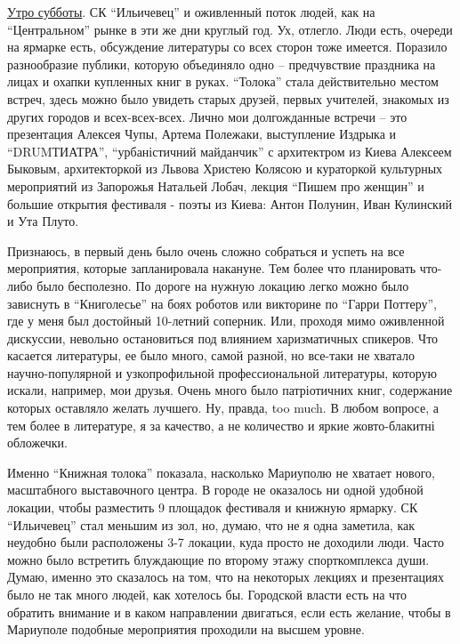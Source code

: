 \href{https://mrpl.city/news/view/knizhnaya-toloka-v-mariupole-kak-prohodit-pervyj-den-literaturnogo-festivalya-foto-plusvideo}{Утро
субботы}. СК \enquote{Ильичевец} и оживленный поток людей, как на \enquote{Центральном} рынке в
эти же дни круглый год. Ух, отлегло. Люди есть, очереди на ярмарке есть,
обсуждение литературы со всех сторон тоже имеется. Поразило разнообразие
публики, которую объединяло одно – предчувствие праздника на лицах и охапки
купленных книг в руках. \enquote{Толока} стала действительно местом встреч, здесь можно
было увидеть старых друзей, первых учителей, знакомых из других городов и
всех-всех-всех. Лично мои долгожданные встречи – это презентация Алексея Чупы,
Артема Полежаки, выступление Издрыка и \enquote{DRUMТИАТРА}, \enquote{урбаністичний майданчик}
с архитектром из Киева Алексеем Быковым, архитекторкой из Львова Христею
Колясою и кураторкой культурных мероприятий из Запорожья Натальей Лобач, лекция
\enquote{Пишем про женщин} и большие открытия фестиваля - поэты из Киева: Антон
Полунин, Иван Кулинский и Ута Плуто.


Признаюсь, в первый день было очень сложно собраться и успеть на все
мероприятия, которые запланировала накануне. Тем более что планировать что-либо
было бесполезно. По дороге на нужную локацию легко можно было зависнуть в
\enquote{Книголесье} на боях роботов или викторине по \enquote{Гарри Поттеру}, где у меня был
достойный 10-летний соперник. Или, проходя мимо оживленной дискуссии, невольно
остановиться под влиянием харизматичных спикеров. Что касается литературы, ее
было много, самой разной, но все-таки не хватало научно-популярной и
узкопрофильной профессиональной литературы, которую искали, например, мои
друзья. Очень много было патріотичних книг, содержание которых оставляло желать
лучшего. Ну, правда, too much. В любом вопросе, а тем более в литературе, я за
качество, а не количество и яркие жовто-блакитні обложечки. 


Именно \enquote{Книжная толока} показала, насколько Мариуполю не хватает нового,
масштабного выставочного центра. В городе не оказалось ни одной удобной
локации, чтобы разместить 9 площадок фестиваля и книжную ярмарку. СК
\enquote{Ильичевец} стал меньшим из зол, но, думаю, что не я одна заметила, как
неудобно были расположены 3-7 локации, куда просто не доходили люди. Часто
можно было встретить блуждающие по второму этажу спорткомплекса души. Думаю,
именно это сказалось на том, что на некоторых лекциях и презентациях было не
так много людей, как хотелось бы. Городской власти есть на что обратить
внимание и в каком направлении двигаться, если есть желание, чтобы в Мариуполе
подобные мероприятия проходили на высшем уровне.

